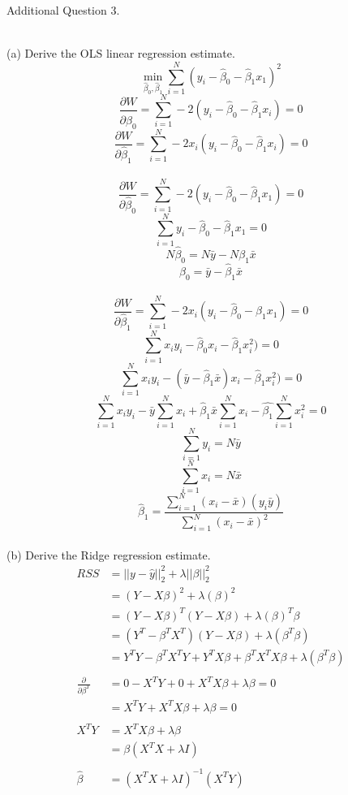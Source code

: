\documentclass[draft]{exam} %
\theoremstyle{definition} \newtheorem*{defn}{Definition}
\begin{document}
\begin{questions}
\begin{solution}  %

\end{solution}


\question Additional Question 3. \\

\begin{solution} \\ %
(a) Derive the OLS linear regression estimate. \\

$$\min_{\hat{\beta}_0,\hat{\beta}_1}\sum_{i=1}^N (y_i - \hat{\beta}_0 - \hat{\beta}_1 x_1)^2$$
$$\frac{\partial W}{\partial \hat{\beta}_0} = \sum_{i=1}^N -2(y_i - \hat{\beta}_0 -\hat{\beta}_1 x_i) = 0$$
$$\frac{\partial W}{\partial \hat{\beta}_1} = \sum_{i=1}^N -2x_i(y_i - \hat{\beta}_0 -\hat{\beta}_1 x_i) = 0$$
\\
$$\frac{\partial W}{\partial \hat{\beta}_0} = \sum_{i=1}^N -2(y_i - \hat{\beta}_0 -\hat{\beta}_1 x_1) = 0$$
$$\sum_{i=1}^N y_i - \hat{\beta}_0 -\hat{\beta}_1 x_1 = 0$$
$$N \hat{\beta}_0 = N \bar{y} - N \hat{\beta_1} \bar{x}$$
$$\hat{\beta}_0 = \bar{y} - \hat{\beta}_1 \bar{x}$$
\\
$$\frac{\partial W}{\partial \hat{\beta}_1} = \sum_{i=1}^N -2x_i(y_i - \hat{\beta}_0 -\hat{\beta}_1 x_1) = 0$$
$$ \sum_{i=1}^N x_i y_i - \hat{\beta}_0 x_i -\hat{\beta}_1 x_i^2) = 0$$
$$ \sum_{i=1}^N x_i y_i - (\bar{y} - \hat{\beta}_1 \bar{x}) x_i -\hat{\beta}_1 x_i^2) = 0$$
$$\sum_{i=1}^N x_i y_i - \bar{y}\sum_{i=1}^N x_i + \hat{\beta}_1 \bar{x} \sum_{i=1}^N x_i - \hat{\beta_1}\sum_{i=1}^N x_i^2 = 0$$
$$\sum_{i=1}^N y_i = N \bar{y}$$
$$\sum_{i=1}^N x_i = N \bar{x}$$
$$\hat{\beta}_1 = \frac{\sum_{i=1}^N (x_i-\bar{x})(y_i \bar{y})}{\sum_{i=1}^N (x_i - \bar{x})^2}$$
\\
(b) Derive the Ridge regression estimate. \\
\begin{align*}
RSS & = ||y-\hat{y}||_2^2 + \lambda || \beta ||_2^2 \\
& = ( Y - X \beta )^2 + \lambda(\beta)^2 \\
& = ( Y - X \beta )^T ( Y - X \beta ) + \lambda ( \beta )^T \beta \\
& = ( Y^T - \beta^T X^T )( Y - X \beta ) + \lambda( \beta^T \beta ) \\
& = Y^T Y - \beta^T X^T Y + Y^T X \beta + \beta^T X^T X \beta + \lambda ( \beta^T \beta ) \\\\
\frac{\partial}{\partial \beta^T} & = 0 - X^T Y + 0 + X^T X \beta + \lambda \beta = 0 \\
& = X^T Y + X^T X \beta + \lambda \beta = 0 \\\\
X^T Y & = X^T X \beta + \lambda \beta \\
& = \beta ( X^T X + \lambda I ) \\\\
\hat{\beta} & = ( X^T X + \lambda I )^{-1}( X^T Y )  
\end{align*}


\end{solution}
\end{questions}
\end{document}
